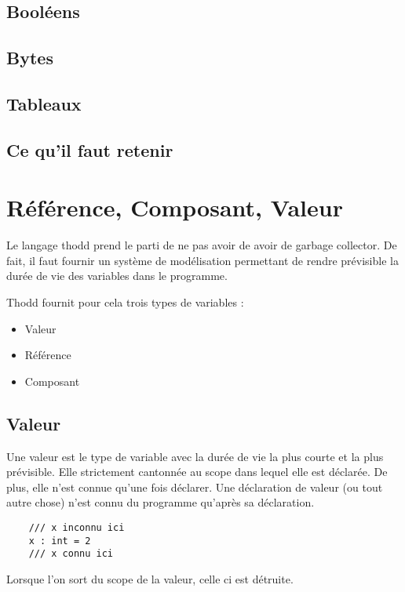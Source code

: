 \documentclass{report}
\begin{document}
\section{Booléens}

\section{Bytes}

\section{Tableaux}

\section{Ce qu'il faut retenir}






\chapter{Référence, Composant, Valeur}
 
Le langage thodd prend le parti de ne pas avoir de avoir de garbage collector. 
De fait, il faut fournir un système de modélisation permettant de rendre prévisible
la durée de vie des variables dans le programme.

Thodd fournit pour cela trois types de variables :
\begin{itemize}
    \item Valeur
    \item Référence
    \item Composant
\end{itemize} 

\section{Valeur}
Une valeur est le type de variable avec la durée de vie la plus courte et la plus prévisible.
Elle strictement cantonnée au scope dans lequel elle est déclarée. De plus, elle n'est connue qu'une 
fois déclarer. Une déclaration de valeur (ou tout autre chose)  n'est connu du programme qu'après sa 
déclaration.

\begin{verbatim}
    /// x inconnu ici
    x : int = 2
    /// x connu ici
\end{verbatim} 

Lorsque l'on sort du scope de la valeur, celle ci est détruite.
\end{document}
